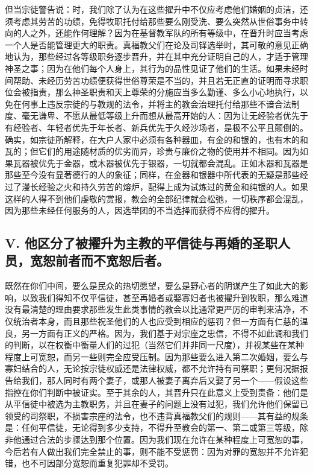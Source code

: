 但当宗徒警告说：时，我们除了认为在这些擢升中不仅应考虑他们婚姻的贞洁，还须考虑其劳苦的功绩，免得牧职托付给那些要么刚受洗、要么突然从世俗事务中转向的人之外，还能作何理解？因为在基督教军队的所有等级中，在晋升时应当考虑一个人是否能管理更大的职责。真福教父们在论及司铎选举时，其可敬的意见正确地认为，那些经过各等级职务逐步晋升，并在其中充分证明自己的人，才适于管理神圣之事；因为在他们每个人身上，其行为的品性见证了他们的生活。如果未经时间帮助、未经历劳苦功绩便获得世俗尊荣是不当的，并且若无正直的证明而寻求职位会被指责，那么神圣职责和天上尊荣的分施应当多么勤谨、多么小心地执行，以免在何事上违反宗徒的与教规的法令，并将主的教会治理托付给那些不谙合法制度、毫无谦卑、不愿从最低等级上升而想从最高开始的人：因为让无经验者优先于有经验者、年轻者优先于年长者、新兵优先于久经沙场者，是极不公平且颠倒的。确实，如宗徒所解释，在大户人家中必须有各种器皿，有金的和银的，也有木的和瓦的；但它们的用途随材质的优劣而异，珍贵与廉价之物的使用并不相同。因为如果瓦器被优先于金器，或木器被优先于银器，一切就都会混乱。正如木器和瓦器是那些至今没有显著德行的人的象征；同样，在金器和银器中所代表的无疑是那些经过了漫长经验之火和持久劳苦的熔炉，配得上成为试炼过的黄金和纯银的人。如果这样的人得不到他们虔敬的赏报，教会的全部纪律就会松弛，一切秩序都会混乱，因为那些未经任何服务的人，因选举团的不当选择而获得不应得的擢升。\par


\subsection{V. 他区分了被擢升为主教的平信徒与再婚的圣职人员，宽恕前者而不宽恕后者。}

既然在你们中间，要么是民众的热切愿望，要么是野心者的阴谋产生了如此大的影响，以致我们得知不仅平信徒，甚至再婚者或娶寡妇者也被擢升到牧职，那么难道没有最清楚的理由要求那些发生此类事情的教会以比通常更严厉的审判来洁净，不仅统治者本身，而且那些祝圣他们的人也应受到相应的惩罚？但一方面有仁慈的温良，另一方面有正义的严格。因为，我们基于对宗座之忠信，不得不如此调和我们的判断，以在权衡中衡量人们的过犯（当然它们并非同一尺度），并视某些在某种程度上可宽恕，而另一些则完全应受压制。因为那些要么进入第二次婚姻，要么与寡妇结合的人，无论按宗徒权威还是法律权威，都不允许持有司祭职；更何况据报告给我们，那人同时有两个妻子，或那人被妻子离弃后又娶了另一个——假设这些指控在你们判断中被证实。至于其余的人，其晋升只在此意义上受到责备：他们是从平信徒中被选为主教职务，并且在妻子的问题上没有过犯，我们允许他们保留已领受的司祭职，不损害宗座的法令，也不违背真福教父们的规则——其有益的规条是：任何平信徒，无论得到多少支持，不得升至教会的第一、第二或第三等级，除非他通过合法的步骤达到那个位置。因为我们现在允许在某种程度上可宽恕的事，今后若有人做出我们完全禁止的事，则不能不受惩罚：因为对罪的宽恕并不允许犯错，也不可因部分宽恕而重复犯罪却不受罚。\par

